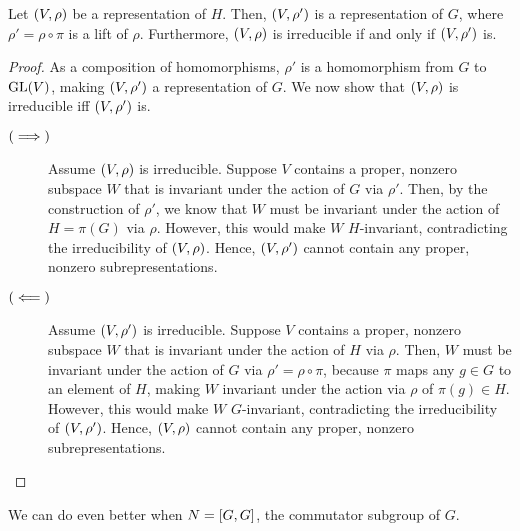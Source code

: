 \begin{proposition}\label{Ch1:Prop:Lifting}
    Let $\left( V, \rho \right)$ be a representation of $H$. Then, $\left( V, \rho' \right)$ is a representation of $G$, where $\rho' = \rho \circ \pi$ is a lift of $\rho$. Furthermore, $\left( V, \rho \right)$ is irreducible if and only if $\left( V, \rho' \right)$ is.
\end{proposition}
\begin{proof}
    As a composition of homomorphisms, $\rho'$ is a homomorphism from $G$ to $\operatorname{GL}\!\left( V \right)$, making $\left( V, \rho' \right)$ a representation of $G$. We now show that $\left( V, \rho \right)$ is irreducible iff $\left( V, \rho' \right)$ is.
    \begin{description}
        \item[$\left( \implies \right)$] Assume $\left( V, \rho \right)$ is irreducible. Suppose $V$ contains a proper, nonzero subspace $W$ that is invariant under the action of $G$ via $\rho'$. Then, by the construction of $\rho'$, we know that $W$ must be invariant under the action of $H = \pi(G)$ via $\rho$. However, this would make $W$ $H$-invariant, contradicting the irreducibility of $\left( V, \rho \right)$. Hence, $\left( V, \rho' \right)$ cannot contain any proper, nonzero subrepresentations.

        \item[$\left( \impliedby \right)$] Assume $\left( V, \rho' \right)$ is irreducible. Suppose $V$ contains a proper, nonzero subspace $W$ that is invariant under the action of $H$ via $\rho$. Then, $W$ must be invariant under the action of $G$ via $\rho' = \rho \circ \pi$, because $\pi$ maps any $g \in G$ to an element of $H$, making $W$ invariant under the action via $\rho$ of $\pi(g) \in H$. However, this would make $W$ $G$-invariant, contradicting the irreducibility of $\left( V, \rho' \right)$. Hence, $\left( V, \rho \right)$ cannot contain any proper, nonzero subrepresentations.
    \end{description}
\end{proof}

We can do even better when $N = \left[ G, G \right]$, the commutator subgroup of $G$.

